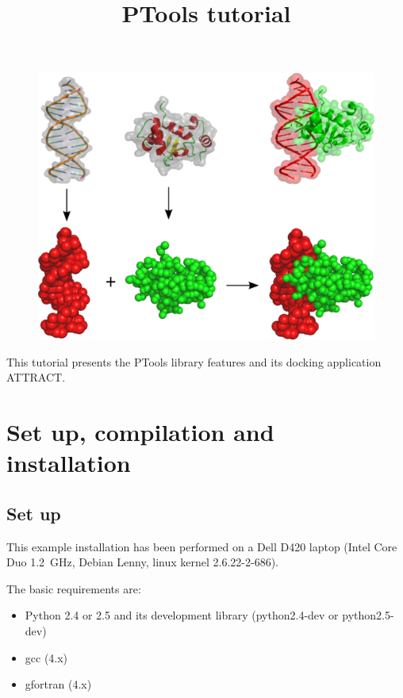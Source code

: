 \documentclass[12pt,a4paper]{article}
\begin{document}
\title{PTools tutorial}
\maketitle

\thispagestyle{empty}

\begin{figure}[htbp]
\center
\includegraphics*[width=0.80\linewidth]{img/docking.png}
\end{figure}


\vspace*{3cm}

\noindent
This tutorial presents the PTools library features and its docking application ATTRACT.

\newpage

\tableofcontents{}

\newpage

\section{Set up, compilation and installation}

\subsection{Set up}
This example installation has been performed on a Dell D420 laptop (Intel
Core Duo 1.2~GHz, Debian Lenny, linux kernel 2.6.22-2-686).

The basic requirements are:
\begin{itemize}
\item Python 2.4 or 2.5 and its development library (python2.4-dev or python2.5-dev)
\item gcc (4.x)
\item gfortran (4.x)
\end{itemize}
\end{document}
